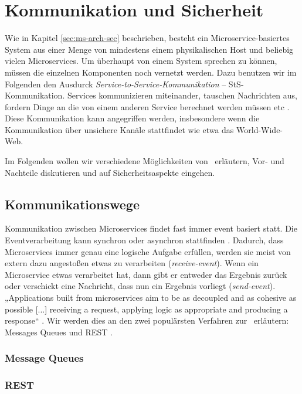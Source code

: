 \section{Kommunikation und Sicherheit}

Wie in Kapitel \ref{sec:ms-arch-sec} beschrieben, besteht ein Microservice-basiertes System aus einer Menge von mindestens einem physikalischen Host und beliebig vielen Microservices. Um überhaupt von einem System sprechen zu können, müssen die einzelnen Komponenten noch vernetzt werden. Dazu benutzen wir im Folgenden den Ausdurck \textit{Service-to-Service-Kommunikation} -- StS-Kommunikation. Services kommunizieren miteinander, tauschen Nachrichten aus, fordern Dinge an die von einem anderen Service berechnet werden müssen etc \cite{newman2015}. Diese Kommunikation kann angegriffen werden, insbesondere wenn die Kommunikation über unsichere Kanäle stattfindet wie etwa das World-Wide-Web.

Im Folgenden wollen wir verschiedene Möglichkeiten von \stscom\ erläutern, Vor- und Nachteile diskutieren und auf Sicherheitsaspekte eingehen.

\subsection{Kommunikationswege}

Kommunikation zwischen Microservices findet fast immer event basiert statt. Die Eventverarbeitung kann synchron oder asynchron stattfinden \cite{newman2015}. Dadurch, dass Microservices immer genau eine logische Aufgabe erfüllen, werden sie meist von extern dazu angestoßen etwas zu verarbeiten (\textit{receive-event}). Wenn ein Microservice etwas verarbeitet hat, dann gibt er entweder das Ergebnis zurück oder verschickt eine Nachricht, dass nun ein Ergebnis vorliegt (\textit{send-event}). „Applications built from microservices aim to be as decoupled and as cohesive as possible [...] receiving a request, applying logic as appropriate and producing a response“ \cite{Fowler+14}. Wir werden dies an den zwei populärsten Verfahren zur \stscom\ erläutern: Messages Queues und REST \cite{newman2015}.

\subsubsection{Message Queues}

\subsubsection{REST}

